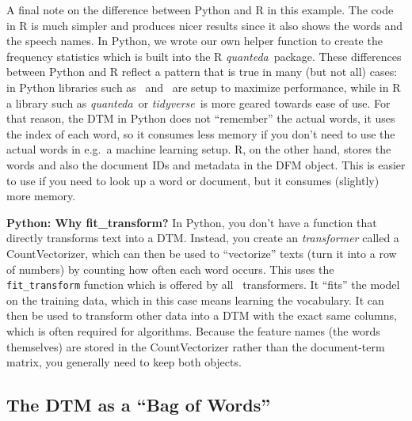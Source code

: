 A final note on the difference between Python and R in this example.
The code in R is much simpler and produces nicer results since it also shows the words and the speech names.
In Python, we wrote our own helper function to create the frequency statistics which is built into the R \emph{quanteda}\ package.
These differences between Python and R reflect a pattern that is true in many (but not all) cases:
in Python libraries such as \numpy\ and \sklearn\ are setup to maximize performance,
while in R a library such as \emph{quanteda}\ or \emph{tidyverse}\ is more geared towards ease of use.
For that reason, the DTM in Python does not ``remember'' the actual words, it uses the index of each word,
so it consumes less memory if you don't need to use the actual words in e.g.\ a machine learning setup.
R, on the other hand, stores the words and also the document IDs and metadata in the DFM object.
This is easier to use if you need to look up a word or document, but it consumes (slightly) more memory.



\begin{feature}
\noindent\textbf{Python: Why fit\_transform?}
In Python, you don't have a function that directly transforms text into a DTM.
Instead, you create an \emph{transformer} called a CountVectorizer,
which can then be used to ``vectorize'' texts (turn it into a row of numbers)
by counting how often each word occurs.
This uses the \texttt{fit\_transform} function which is offered by all \sklearn\ transformers.
It ``fits'' the model on the training data, which in this case means learning the vocabulary.
It can then be used to transform other data into a DTM with the exact same columns,
which is often required for algorithms.
Because the feature names (the words themselves) are stored in the CountVectorizer
rather than the document-term matrix, you generally need to keep both objects.
\end{feature}

\subsection{The DTM as a ``Bag of Words''}


